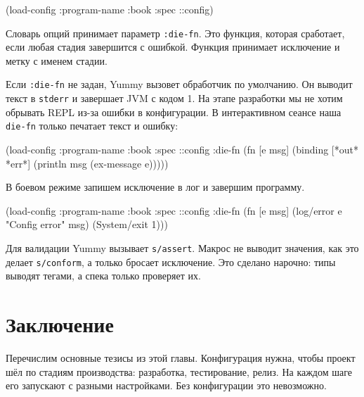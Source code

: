 \begin{english}
  \begin{clojure}
(load-config {:program-name :book
              :spec ::config})
  \end{clojure}
\end{english}


Словарь опций принимает параметр \verb|:die-fn|. Это функция, которая
сработает, если любая стадия завершится с ошибкой. Функция принимает исключение
и метку с именем стадии.


Если \verb|:die-fn| не задан, Yummy вызовет обработчик по умолчанию. Он
выводит текст в \verb|stderr| и завершает JVM с кодом 1. На этапе разработки
мы не хотим обрывать REPL из-за ошибки в конфигурации. В интерактивном сеансе
наша \verb|die-fn| только печатает текст и ошибку:

\begin{english}
  \begin{clojure}
(load-config
 {:program-name :book
  :spec ::config
  :die-fn (fn [e msg]
            (binding [*out* *err*]
              (println msg (ex-message e))))})
  \end{clojure}
\end{english}

\noindent
В боевом режиме запишем исключение в лог и завершим программу.


\begin{english}
  \begin{clojure}
(load-config
 {:program-name :book
  :spec ::config
  :die-fn (fn [e msg]
            (log/error e "Config error" msg)
            (System/exit 1))})
  \end{clojure}
\end{english}

Для валидации Yummy вызывает \verb|s/assert|. Макрос не выводит значения, как
это делает \verb|s/conform|, а только бросает исключение. Это сделано нарочно:
типы выводят тегами, а спека только проверяет их.

\section{Заключение}

Перечислим основные тезисы из этой главы. Конфигурация нужна, чтобы проект шёл
по стадиям производства: разработка, тестирование, релиз. На каждом шаге его
запускают с разными настройками. Без конфигурации это невозможно.

